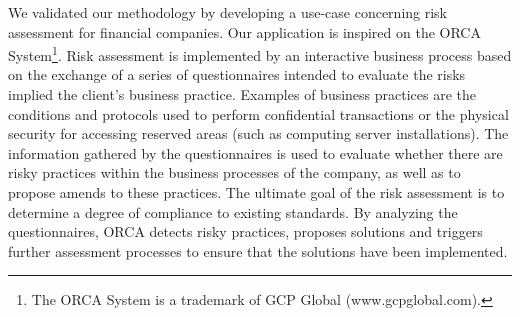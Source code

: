 %
%
%
%
%

We validated our methodology by developing a use-case concerning risk assessment for financial companies.
Our application is inspired on the ORCA System\footnote{The ORCA System is a trademark of GCP Global (www.gcpglobal.com).}.
Risk assessment is implemented by an interactive business process based on the exchange of a series of questionnaires intended to evaluate the risks implied the client's business practice.
Examples of business practices are the conditions and protocols used to perform confidential transactions or the physical security for accessing reserved areas (such as computing server installations).
The information gathered by the questionnaires is used to evaluate whether there are risky practices within the business processes of the company, as well as to propose amends to these practices.
The ultimate goal of the risk assessment is to determine a degree of compliance to existing standards.
By analyzing the questionnaires, ORCA detects risky practices, proposes solutions and triggers further assessment processes to ensure that the solutions have been implemented.

